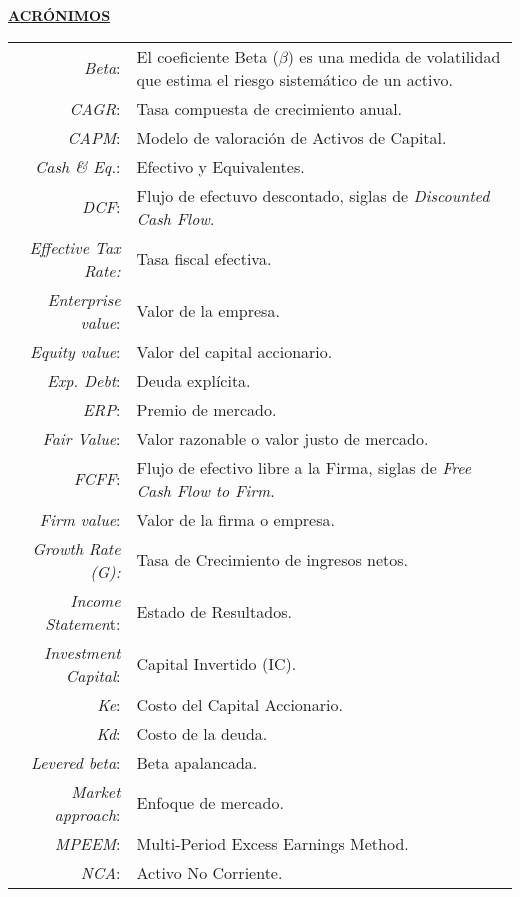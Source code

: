 \begin{center}
	\underline{\textbf{\textcolor{principal}{ACR\'ONIMOS}}}
\end{center}

\begin{table}[H]
 	\begin{tabular}{rp{10cm}}
\textit{Beta}:&	El coeficiente Beta ($\beta$) es una medida de volatilidad que estima el riesgo sistem\'atico de un activo.\\
\textit{CAGR}:&	Tasa compuesta de crecimiento anual.\\
\textit{CAPM}:&	Modelo de valoraci\'on de Activos de Capital.\\
\textit{Cash \& Eq.}:&	Efectivo y Equivalentes.\\
\textit{DCF}:&	Flujo de efectuvo descontado, siglas de \textit{Discounted Cash Flow}.\\\textit{Effective Tax Rate:}&	Tasa fiscal efectiva.\\
\textit{Enterprise value}:&	Valor de la empresa.\\
\textit{Equity value}:&	Valor del capital accionario.\\
\textit{Exp. Debt}:& 	Deuda expl\'icita.\\
\textit{ERP}:	& Premio de mercado.\\
\textit{Fair Value}:&	Valor razonable o valor justo de mercado.\\
\textit{FCFF}:&	Flujo de efectivo libre a la Firma, siglas de \textit{Free Cash Flow to Firm}.\\
\textit{Firm value}:&	Valor de la firma o empresa.\\
\textit{Growth Rate (G):}&	Tasa de Crecimiento de ingresos netos.\\
\textit{Income Statemen}t:&	Estado de Resultados.\\
\textit{Investment Capital}:& 	Capital Invertido (IC).\\
\textit{Ke}:& 	Costo del Capital Accionario.\\
\textit{Kd}:& 	Costo de la deuda.\\
\textit{Levered beta}:& 	Beta apalancada.\\
\textit{Market approach}:& 	Enfoque de mercado.\\
\textit{MPEEM}:&	Multi-Period Excess Earnings Method.\\
\textit{NCA}:&	Activo No Corriente.\\

\end{tabular}
\end{table}
